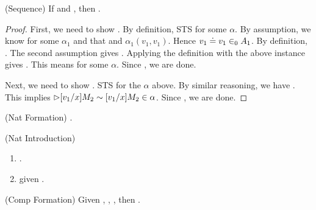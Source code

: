 \begin{lemma}(Sequence)
  If  and , then 
  .
\end{lemma}

\begin{proof}
  First, we need to show .
  By definition, STS  for some $\alpha$. 
  By assumption, we know  for some $\alpha_1$ and 
  that  and $\alpha_1(v_1,v_1)$. Hence $v_1 \doteq v_1 \in_0 A_1$.
  By definition, .
  The second assumption gives . 
  Applying the definition with the above instance gives 
  . This means 
  for some $\alpha$. Since
  , we are done.

  Next, we need to show .
  STS  for the $\alpha$
  above. By similar reasoning, we have .
  This implies $ \rhd [v_1/x]M_2 \sim [v_1/x]M_2 \in \alpha$.
  Since , we are done.
\end{proof}

\begin{lemma}(Nat Formation)
  \eqType{\nat}{\nat}.
\end{lemma}

\begin{lemma}(Nat Introduction)
  \begin{enumerate}
    \item \eqVal{\zero}{\zero}{\nat}. 
    \item {} given .
  \end{enumerate}
\end{lemma}

\begin{lemma}(Comp Formation)
  Given , , , then
  .
\end{lemma}

